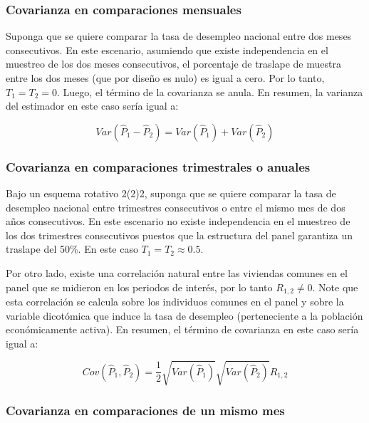 \documentclass[
  10pt,
  spanish,
]{book}
\begin{document}
\hypertarget{covarianza-en-comparaciones-mensuales}{%
\subsubsection*{Covarianza en comparaciones mensuales}\label{covarianza-en-comparaciones-mensuales}}

Suponga que se quiere comparar la tasa de desempleo nacional entre dos meses consecutivos. En este escenario, asumiendo que existe independencia en el muestreo de los dos meses consecutivos, el porcentaje de traslape de muestra entre los dos meses (que por diseño es nulo) es igual a cero. Por lo tanto, \(T_1 = T_2 = 0\). Luego, el término de la covarianza se anula. En resumen, la varianza del estimador en este caso sería igual a:

\[
Var(\hat{P}_1-\hat{P}_2) 
= Var(\hat{P}_1) + Var(\hat{P}_2)
\]

\hypertarget{covarianza-en-comparaciones-trimestrales-o-anuales}{%
\subsubsection*{Covarianza en comparaciones trimestrales o anuales}\label{covarianza-en-comparaciones-trimestrales-o-anuales}}

Bajo un esquema rotativo 2(2)2, suponga que se quiere comparar la tasa de desempleo nacional entre trimestres consecutivos o entre el mismo mes de dos años consecutivos. En este escenario no existe independencia en el muestreo de los dos trimestres consecutivos puestos que la estructura del panel garantiza un traslape del 50\%. En este caso \(T_1 = T_2 \approx 0.5\).

Por otro lado, existe una correlación natural entre las viviendas comunes en el panel que se midieron en los periodos de interés, por lo tanto \(R_{1,2} \neq 0\). Note que esta correlación se calcula sobre los individuos comunes en el panel y sobre la variable dicotómica que induce la tasa de desempleo (perteneciente a la población económicamente activa). En resumen, el término de covarianza en este caso sería igual a:

\[
Cov(\hat{P}_1, \hat{P}_2) = \frac{1}{2}\sqrt{Var(\hat{P}_1)}\sqrt{Var(\hat{P}_2)}R_{1,2}
\]

\hypertarget{covarianza-en-comparaciones-de-un-mismo-mes}{%
\subsubsection*{Covarianza en comparaciones de un mismo mes}\label{covarianza-en-comparaciones-de-un-mismo-mes}}
\end{document}
